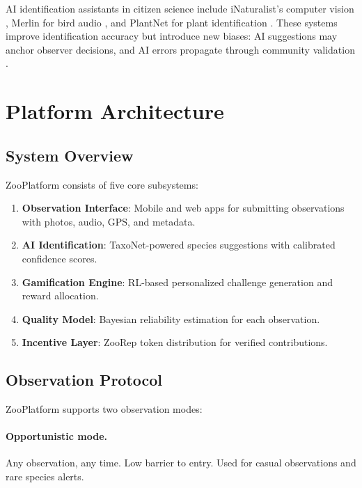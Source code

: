 \documentclass[11pt,a4paper]{article}
\begin{document}
AI identification assistants in citizen science include iNaturalist's
computer vision \citep{van2021benchmarking}, Merlin for bird audio
\citep{kahl2021birdnet}, and PlantNet for plant identification
\citep{goeau2022overview}. These systems improve identification accuracy
but introduce new biases: AI suggestions may anchor observer decisions,
and AI errors propagate through community validation
\citep{terry2020think}.


\section{Platform Architecture}
\label{sec:architecture}

\subsection{System Overview}

ZooPlatform consists of five core subsystems:

\begin{enumerate}
  \item \textbf{Observation Interface}: Mobile and web apps for
    submitting observations with photos, audio, GPS, and metadata.
  \item \textbf{AI Identification}: TaxoNet-powered species suggestions
    with calibrated confidence scores.
  \item \textbf{Gamification Engine}: RL-based personalized challenge
    generation and reward allocation.
  \item \textbf{Quality Model}: Bayesian reliability estimation for
    each observation.
  \item \textbf{Incentive Layer}: ZooRep token distribution for
    verified contributions.
\end{enumerate}

\subsection{Observation Protocol}

ZooPlatform supports two observation modes:

\paragraph{Opportunistic mode.} Any observation, any time. Low barrier
to entry. Used for casual observations and rare species alerts.
\end{document}
